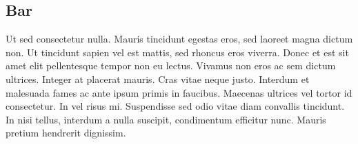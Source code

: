 \subsection{Bar}

Ut sed consectetur nulla. Mauris tincidunt egestas
eros, sed laoreet magna dictum non. Ut tincidunt
sapien vel est mattis, sed rhoncus eros viverra.
Donec et est sit amet elit pellentesque tempor non
eu lectus. Vivamus non eros ac sem dictum ultrices.
Integer at placerat mauris. Cras vitae neque justo.
Interdum et malesuada fames ac ante ipsum primis in
faucibus. Maecenas ultrices vel tortor id
consectetur. In vel risus mi. Suspendisse sed odio
vitae diam convallis tincidunt. In nisi tellus,
interdum a nulla suscipit, condimentum efficitur
nunc. Mauris pretium hendrerit dignissim.

